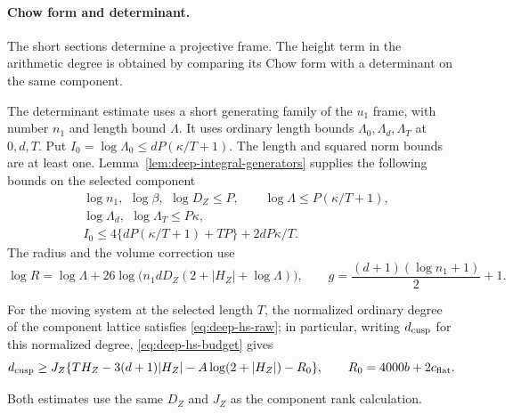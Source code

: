 \paragraph{Chow form and determinant.}

The short sections determine a projective frame. The height term in the arithmetic degree is obtained by comparing its Chow form with a determinant on the same component.

The determinant estimate uses a short generating family
of the \(u_1\) frame, with number \(n_1\) and length bound
\(\Lambda\). It uses ordinary length bounds
\(\Lambda_0,\Lambda_d,\Lambda_T\) at \(0,d,T\). Put
\(I_0=\log\Lambda_0\le dP(\kappa/T+1)\).
The length and squared norm bounds are at least one.
Lemma~\ref{lem:deep-integral-generators} supplies the following
bounds on the selected component
\begin{align*}
 &\log n_1,\ \,\log\beta,\ \,\log D_Z\le P,
 \qquad \log\Lambda\le P(\kappa/T+1),\\
 &\log\Lambda_d,\ \,\log\Lambda_T\le P\kappa,\\
 &I_0\le4\{dP(\kappa/T+1)+TP\}+2dP\kappa/T.
\end{align*}
The radius and the volume correction use
\[
 \log R=\log\Lambda+26\log\big(n_1 d D_Z
                 (2+|H_Z|+\log\Lambda)\big),
 \qquad
 g=\frac{(d+1)(\log n_1+1)}{2}+1 .
\]

\begin{proposition}
\label{prop:component-arithmetic-degree}
For the moving system at the selected length \(T\), the normalized
ordinary degree of the component lattice satisfies
\eqref{eq:deep-hs-raw}; in particular, writing \(d_{\rm cusp}\) for this normalized degree, \eqref{eq:deep-hs-budget} gives
\[
 d_{\rm cusp}\ge J_Z\{T H_Z-3(d+1)|H_Z|-A\log(2+|H_Z|)-R_0\},\qquad R_0=4000b+2c_{\rm flat}.
\]

Both estimates use the same \(D_Z\) and \(J_Z\) as the
component rank calculation.
\end{proposition}


